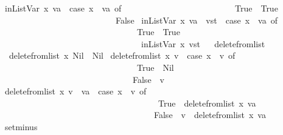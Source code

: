 \begin{isabellebody}
{\isacharbar}\ {\isachardoublequoteopen}inListVar\ x\ {\isacharbrackleft}va{\isacharbrackright}\ {\isacharequal}\ {\isacharparenleft}case\ x\ {\isacharequal}\ va\ of\isanewline
\ \ \ \ \ \ \ \ \ \ \ \ \ \ \ \ \ \ \ \ \ \ \ \ \ \ True\ {\isasymRightarrow}\ True\isanewline
\ \ \ \ \ \ \ \ \ \ \ \ \ \ \ \ \ \ \ \ \ \ \ \ {\isacharbar}\ {\isacharunderscore}\ {\isasymRightarrow}\ False{\isacharparenright}{\isachardoublequoteclose}\isanewline
{\isacharbar}\ {\isachardoublequoteopen}inListVar\ x\ {\isacharparenleft}va\ {\isacharhash}\ vst{\isacharparenright}\ {\isacharequal}\ {\isacharparenleft}case\ x\ {\isacharequal}\ va\ of\isanewline
\ \ \ \ \ \ \ \ \ \ \ \ \ \ \ \ \ \ \ \ \ \ \ \ \ \ \ \ \ \ \ \ True\ {\isasymRightarrow}\ True\isanewline
\ \ \ \ \ \ \ \ \ \ \ \ \ \ \ \ \ \ \ \ \ \ \ \ \ \ \ \ \ \ {\isacharbar}\ {\isacharunderscore}\ {\isasymRightarrow}\ inListVar\ x\ vst{\isacharparenright}{\isachardoublequoteclose}\isanewline
\isanewline
\ \isanewline
{}\isamarkupfalse%
\ delete{\isacharunderscore}from{\isacharunderscore}list\isanewline
{}\isanewline
\ \ {\isachardoublequoteopen}delete{\isacharunderscore}from{\isacharunderscore}list\ x\ Nil\ {\isacharequal}\ Nil{\isachardoublequoteclose}\isanewline
{\isacharbar}\ {\isachardoublequoteopen}delete{\isacharunderscore}from{\isacharunderscore}list\ x\ {\isacharbrackleft}v{\isacharbrackright}\ {\isacharequal}\ {\isacharparenleft}case\ x\ {\isacharequal}\ v\ of\isanewline
\ \ \ \ \ \ \ \ \ \ \ \ \ \ \ \ \ \ \ \ \ \ \ \ \ \ \ \ \ \ \ \ True\ {\isasymRightarrow}\ Nil\isanewline
\ \ \ \ \ \ \ \ \ \ \ \ \ \ \ \ \ \ \ \ \ \ \ \ \ \ \ \ \ \ {\isacharbar}\ False\ {\isasymRightarrow}\ {\isacharbrackleft}v{\isacharbrackright}{\isacharparenright}{\isachardoublequoteclose}\isanewline
{\isacharbar}\ {\isachardoublequoteopen}delete{\isacharunderscore}from{\isacharunderscore}list\ x\ {\isacharparenleft}v\ {\isacharhash}\ va{\isacharparenright}\ {\isacharequal}\ {\isacharparenleft}case\ x\ {\isacharequal}\ v\ of\isanewline
\ \ \ \ \ \ \ \ \ \ \ \ \ \ \ \ \ \ \ \ \ \ \ \ \ \ \ \ \ \ \ \ \ \ \ \ \ True\ {\isasymRightarrow}\ delete{\isacharunderscore}from{\isacharunderscore}list\ x\ va\isanewline
\ \ \ \ \ \ \ \ \ \ \ \ \ \ \ \ \ \ \ \ \ \ \ \ \ \ \ \ \ \ \ \ \ \ \ {\isacharbar}\ False\ {\isasymRightarrow}\ {\isacharparenleft}v\ {\isacharhash}\ {\isacharparenleft}delete{\isacharunderscore}from{\isacharunderscore}list\ x\ va{\isacharparenright}{\isacharparenright}{\isacharparenright}{\isachardoublequoteclose}\isanewline
\isanewline
\ \isanewline
{}\isamarkupfalse%
\ setminus\isanewline
{}\isanewline

\end{isabellebody}
